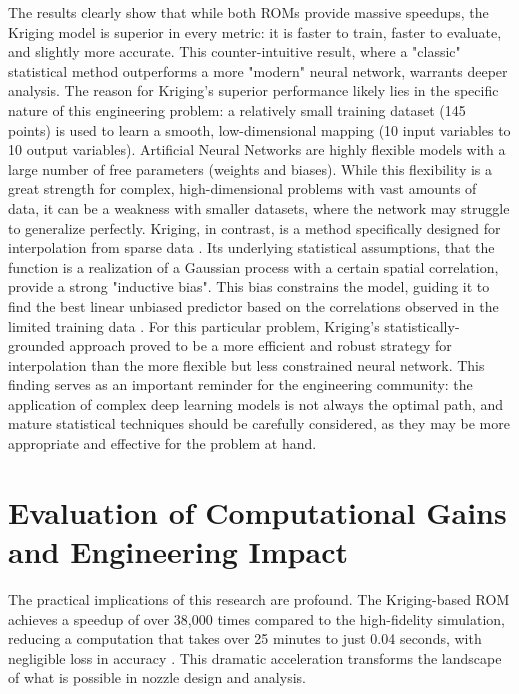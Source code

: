 \documentclass[tg, EN]{ufabcFHZh_tg}
\begin{document}
The results clearly show that while both ROMs provide massive speedups, the Kriging model is superior in every metric: it is faster to train, faster to evaluate, and slightly more accurate. This counter-intuitive result, where a "classic" statistical method outperforms a more "modern" neural network, warrants deeper analysis. The reason for Kriging's superior performance likely lies in the specific nature of this engineering problem: a relatively small training dataset (145 points) is used to learn a smooth, low-dimensional mapping (10 input variables to 10 output variables). Artificial Neural Networks are highly flexible models with a large number of free parameters (weights and biases). While this flexibility is a great strength for complex, high-dimensional problems with vast amounts of data, it can be a weakness with smaller datasets, where the network may struggle to generalize perfectly. Kriging, in contrast, is a method specifically designed for interpolation from sparse data \citep{jones1998, ng2018}. Its underlying statistical assumptions, that the function is a realization of a Gaussian process with a certain spatial correlation, provide a strong "inductive bias". This bias constrains the model, guiding it to find the best linear unbiased predictor based on the correlations observed in the limited training data \citep{rasmussen2006, sacks1989}. For this particular problem, Kriging's statistically-grounded approach proved to be a more efficient and robust strategy for interpolation than the more flexible but less constrained neural network. This finding serves as an important reminder for the engineering community: the application of complex deep learning models is not always the optimal path, and mature statistical techniques should be carefully considered, as they may be more appropriate and effective for the problem at hand.

\section{Evaluation of Computational Gains and Engineering Impact}

The practical implications of this research are profound. The Kriging-based ROM achieves a speedup of over 38,000 times compared to the high-fidelity simulation, reducing a computation that takes over 25 minutes to just 0.04 seconds, with negligible loss in accuracy \citep{moreira2023}. This dramatic acceleration transforms the landscape of what is possible in nozzle design and analysis.
\end{document}
